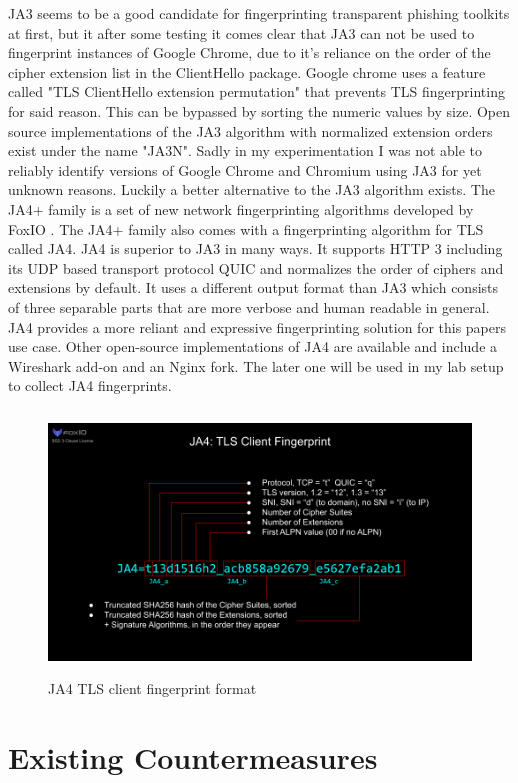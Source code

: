 \documentclass[12pt]{scrbook}
\begin{document}
JA3 seems to be
a good candidate for fingerprinting transparent phishing toolkits at first,
but it after some testing it comes clear that JA3 can not be used to
fingerprint instances of Google Chrome, due to it's reliance on the order of
the cipher extension list in the ClientHello package. Google chrome uses a
feature called "TLS ClientHello extension permutation" that prevents TLS
fingerprinting for said reason. This can be bypassed by sorting the numeric
values by size. Open source implementations of the JA3 algorithm with
normalized extension orders exist under the name "JA3N". Sadly in my
experimentation I was not able to reliably identify versions of Google
Chrome and Chromium using JA3 for yet unknown reasons.
Luckily a better alternative
to the JA3 algorithm exists. The JA4+ family is a set of new network
fingerprinting algorithms developed by FoxIO \cite{foxIOJa4}. The JA4+
family also comes with a fingerprinting algorithm for TLS called JA4. JA4 is
superior to JA3 in many ways. It supports HTTP 3 including its UDP based
transport protocol QUIC and normalizes the order of ciphers and extensions
by default. It uses a different output format than JA3 which consists of
three separable parts that are more verbose and human readable in general. JA4
provides a more reliant and expressive fingerprinting solution for this
papers use case. Other open-source implementations of JA4 are available and
include a Wireshark add-on and an Nginx fork. The later one will be used in
my lab setup to collect JA4 fingerprints.

\begin{figure}[!htb] \centering
	\includegraphics[height=7cm]{./images/JA4.png} \caption{JA4 TLS client
		fingerprint format} \end{figure}

\newpage
\section{Existing Countermeasures}
\end{document}
